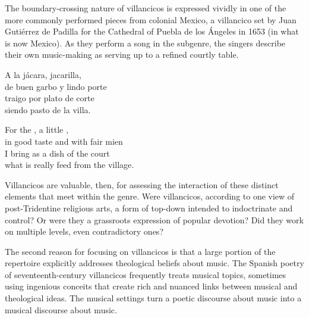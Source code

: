 The boundary-crossing nature of villancicos is expressed vividly in one of the more commonly performed pieces from colonial Mexico, a villancico set by Juan Gutiérrez de Padilla for the Cathedral of Puebla de los Ángeles in 1653 (in what is now Mexico).
As they perform a song in the  subgenre, the singers describe their own music-making as serving up  to a refined courtly table.
\begin{poemtranslation}
\begin{original}
A la jácara, jacarilla, \\
de buen garbo y lindo porte \\
traigo por plato de corte \\
siendo pasto de la villa.
\end{original}
\begin{translation}
For the , a little , \\
in good taste and with fair mien \\
I bring as a dish of the court \\
what is really feed from the village.
\end{translation}
\end{poemtranslation}

Villancicos are valuable, then, for assessing the interaction of these distinct elements that meet within the genre.
Were villancicos, according to one view of post-Tridentine religious arts, a form of top-down  intended to indoctrinate and control?
Or were they a grassroots expression of popular devotion?
Did they work on multiple levels, even contradictory ones?

The second reason for focusing on villancicos is that a large portion of the repertoire explicitly addresses theological beliefs about music.
The Spanish poetry of seventeenth-century villancicos frequently treats musical topics, sometimes using ingenious conceits that create rich and nuanced links between musical and theological ideas.
The musical settings turn a poetic discourse about music into a musical discourse about music.

